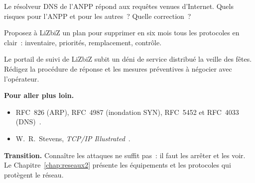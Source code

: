 \begin{boxexo}[title={\ding{45}\quad Exercice~15.8. Le résolveur ouvert \niveaumoyen}]
Le résolveur DNS de l'ANPP répond aux requêtes venues d'Internet. Quels
risques pour l'ANPP et pour les autres~? Quelle correction~?
\end{boxexo}

\begin{boxexo}[title={\ding{45}\quad Exercice~15.9. Un plan de chiffrement \niveauexpert}]
Proposez à LiZbiZ un plan pour supprimer en six mois tous les protocoles
en clair~: inventaire, priorités, remplacement, contrôle.
\end{boxexo}

\begin{boxexo}[title={\ding{45}\quad Exercice~15.10. Le portail sous DDoS \niveauexpert}]
Le portail de suivi de LiZbiZ subit un déni de service distribué la
veille des fêtes. Rédigez la procédure de réponse et les mesures
préventives à négocier avec l'opérateur.
\end{boxexo}

\bigskip

\begin{boxinfo}
\textbf{Pour aller plus loin.}
\begin{itemize}
    \item RFC~826 (ARP), RFC~4987 (inondation SYN), RFC~5452 et RFC~4033
          (DNS)~\cite{rfc826,rfc4987,rfc5452,rfc4033}.
    \item W.~R.~Stevens, \emph{TCP/IP Illustrated}~\cite{stevens1994}.
\end{itemize}
\end{boxinfo}

\begin{boxinfo}
\textbf{Transition.} Connaître les attaques ne suffit pas~: il faut les
arrêter et les voir. Le Chapitre~\ref{chap:reseaux2} présente les
équipements et les protocoles qui protègent le réseau.
\end{boxinfo}
